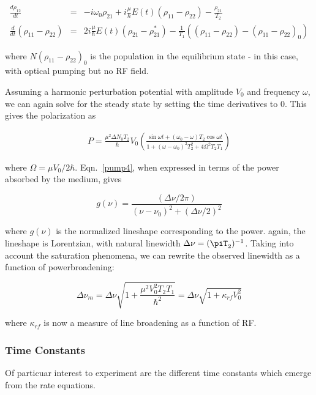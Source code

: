 \begin{eqnarray}
\frac{d\rho_{12}}{dt} &=& -i\omega_0\rho_{21} + i\frac{\mu}{\hbar}E(t)(\rho_{11} - \rho_{22}) - \frac{\rho_{21}}{T_2}\\
\frac{d}{dt}(\rho_{11} - \rho_{22}) &=& 2i\frac{\mu}{\hbar}E(t)(\rho_{21} - \rho_{21}^*) - \frac{1}{T_1}((\rho_{11} - \rho_{22}) - (\rho_{11} - \rho_{22})_0)
\label{pump3}
\end{eqnarray}

where $N(\rho_{11} - \rho_{22})_0$ is the population in the
equilibrium state - in this case, with optical pumping but no RF
field.

Assuming a harmonic perturbation potential with amplitude $V_0$ and
frequency $\omega$, we can again solve for the steady state by setting
the time derivatives to $0$. This gives the polarization as

\begin{eqnarray}
P = \frac{\mu^2\Delta N_0 T_2}{\hbar}V_0\left(\frac{\sin\omega t + (\omega_0 - \omega)T_2\cos\omega t}{1 + (\omega - \omega_0)^2T_2^2 + 4\Omega^2T_2T_1}\right)
\label{pump4}
\end{eqnarray}

where $\Omega = \mu V_0/2\hbar$. Eqn.~\ref{pump4}, when expressed in
terms of the power absorbed by the medium, gives 

\begin{equation}
g(\nu) = \frac{(\Delta\nu/2\pi)}{(\nu-\nu_0)^2 +(\Delta\nu/2)^2}
\label{eqn:gamma1}
\end{equation}

where $g(\nu)$ is the normalized lineshape corresponding to the power. again, the lineshape is Lorentzian, with natural linewidth $\Delta\nu = (\piT_2)^{-1}$. Taking into account the saturation phenomena, we can rewrite the observed linewidth as a function of powerbroadening:

\begin{equation}
\Delta\nu_m = \Delta\nu\sqrt{1+\frac{\mu^2V_0^2T_2T_1}{\hbar^2}} = \Delta\nu\sqrt{1+\kappa_{rf}V_0^2}
\label{eqn:gamma1}
\end{equation}

where $\kappa_{rf}$ is now a measure of line broadening as a function of RF. 


\subsubsection{Time Constants}

Of particuar interest to experiment are the different time constants
which emerge from the rate equations. 

